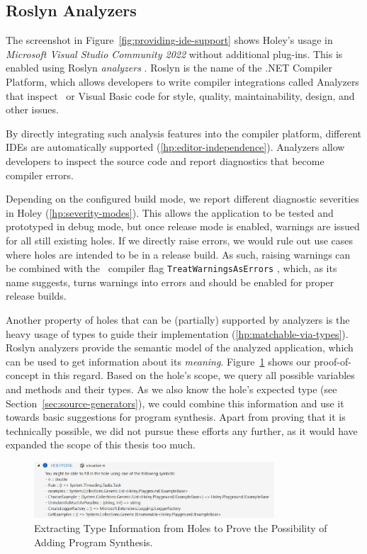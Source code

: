 \subsection{Roslyn Analyzers}
\label{sec:holey-roslyn-analyzers}
The screenshot in Figure~\ref{fig:providing-ide-support} shows Holey's usage in \emph{Microsoft Visual Studio Community 2022} without additional plug-ins.
This is enabled using Roslyn \emph{analyzers} \cite{microsoft_code_2023}.
Roslyn is the name of the .NET Compiler Platform, which allows developers to write compiler integrations called Analyzers that inspect \CS\ or Visual Basic code for style, quality, maintainability, design, and other issues.

By directly integrating such analysis features into the compiler platform, different IDEs are automatically supported (\ref{hp:editor-independence}).
Analyzers allow developers to inspect the source code and report diagnostics that become compiler errors.

Depending on the configured build mode, we report different diagnostic severities in Holey (\ref{hp:severity-modes}).
This allows the application to be tested and prototyped in debug mode, but once release mode is enabled, warnings are issued for all still existing holes.
If we directly raise errors, we would rule out use cases where holes are intended to be in a release build.
As such, raising warnings can be combined with the \CS\ compiler flag \verb|TreatWarningsAsErrors| \cite{microsoft_c_2023}, which, as its name suggests, turns warnings into errors and should be enabled for proper release builds.

Another property of holes that can be (partially) supported by analyzers is the heavy usage of types to guide their implementation (\ref{hp:matchable-via-types}).
Roslyn analyzers provide the semantic model of the analyzed application, which can be used to get information about its \emph{meaning}.
Figure~\ref{fig:reporting-types} shows our proof-of-concept in this regard.
Based on the hole's scope, we query all possible variables and methods and their types.
As we also know the hole's expected type (see Section~\ref{sec:source-generators}), we could combine this information and use it towards basic suggestions for program synthesis.
Apart from proving that it is technically possible, we did not pursue these efforts any further, as it would have expanded the scope of this thesis too much.

\begin{figure}[ht]
    \centering
    \includegraphics[width=0.8\textwidth]{images/reporting-types}
    \caption{Extracting Type Information from Holes to Prove the Possibility of Adding Program Synthesis.}
    \label{fig:reporting-types}
\end{figure}

